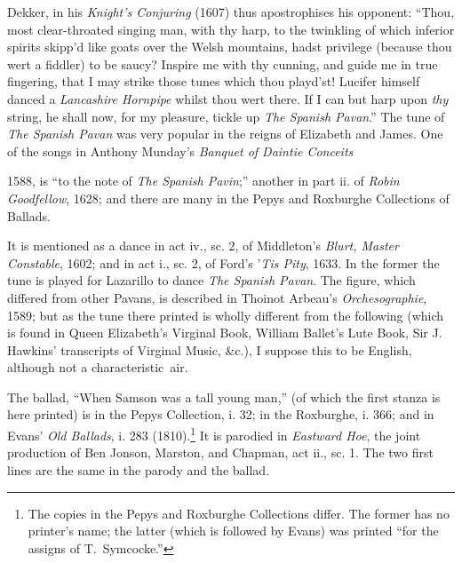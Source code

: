 
\medskip



Dekker, in his \textit{Knight’s Conjuring} (1607) thus apostrophises his opponent:
“Thou, most clear-throated singing man, with thy harp, to the twinkling of
which inferior spirits skipp’d like goats over the Welsh mountains, hadst privilege
(because thou wert a fiddler) to be saucy? Inspire me with thy cunning, and
guide me in true fingering, that I may strike those tunes which thou playd’st!
Lucifer himself danced a \textit{Lancashire Hornpipe} whilst thou wert there. If I can
but harp upon \textit{thy} string, he shall now, for my pleasure, tickle up \textit{The Spanish
Pavan}.” The tune of \textit{The Spanish Pavan} was very popular in the reigns of
Elizabeth and James. One of the songs in \pagebreak Anthony Munday’s \textit{Banquet of Daintie Conceits}
1588, is “to the note of \textit{The Spanish Pavin};” another in
part ii. of \textit{Robin Goodfellow}, 1628; and there are many in the Pepys and Roxburghe
Collections of Ballads.

It is mentioned as a dance in act iv., sc. 2, of Middleton’s \textit{Blurt, Master Constable},
1602; and in act i., sc. 2, of Ford’s ’\textit{Tis Pity}, 1633. In the former the
tune is played for Lazarillo to dance \textit{The Spanish Pavan}. The figure, which
differed from other Pavans, is described in Thoinot Arbeau’s \textit{Orchesographie}, 1589;
but as the tune there printed is wholly different from the following (which is
found in Queen Elizabeth’s Virginal Book, William Ballet’s Lute Book, Sir
J. Hawkins’ transcripts of Virginal Music, \&c.), I suppose this to be English,
although not a characteristic~air.

The ballad, “When Samson was a tall young man,” (of which the first stanza
is here printed) is in the Pepys Collection, i. 32; in the Roxburghe, i. 366; and
in Evans’ \textit{Old Ballads}, i. 283 (1810).\footnote{\textit{}
The copies in the Pepys and Roxburghe Collections
differ. The former has no printer’s name; the latter
(which is followed by Evans) was printed “for the
assigns of T.~Symcocke.”}
 It is parodied in \textit{Eastward Hoe}, the joint
production of Ben Jonson, Marston, and Chapman, act ii., sc. 1. The two first
lines are the same in the parody and the ballad.


